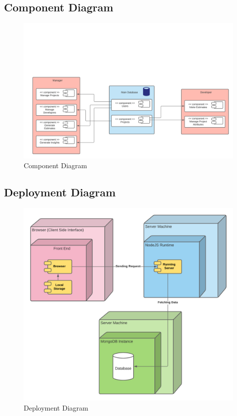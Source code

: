 \subsection{Component Diagram}
\begin{figure}[H]
    \centering
    \includegraphics[scale=0.6]{./diagrams/component-diagram.png}
    \caption{Component Diagram}
    \label{fig:component}
\end{figure}

\subsection{Deployment Diagram}
\begin{figure}[H]
    \centering
    \includegraphics[scale=0.6]{./diagrams/deployment-diagram.png}
    \caption{Deployment Diagram}
    \label{fig:deployment}
\end{figure}
